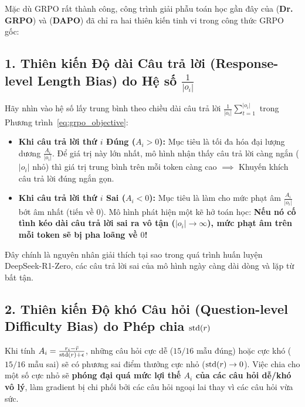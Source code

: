 Mặc dù GRPO rất thành công, công trình giải phẫu toán học gần đây của \citet{liu2025understanding} (\textbf{Dr. GRPO}) và \citet{yu2025dapo} (\textbf{DAPO}) đã chỉ ra hai thiên kiến tinh vi trong công thức GRPO gốc:

\subsection{1. Thiên kiến Độ dài Câu trả lời (Response-level Length Bias) do Hệ số $\frac{1}{|o_i|}$}
Hãy nhìn vào hệ số lấy trung bình theo chiều dài câu trả lời $\frac{1}{|o_i|} \sum_{t=1}^{|o_i|}$ trong Phương trình~\eqref{eq:grpo_objective}:
\begin{itemize}[leftmargin=1.2cm]
    \item \textbf{Khi câu trả lời thứ $i$ Đúng ($A_i > 0$):} Mục tiêu là tối đa hóa đại lượng dương $\frac{A_i}{|o_i|}$. Để giá trị này lớn nhất, mô hình nhận thấy câu trả lời càng ngắn ($|o_i|$ nhỏ) thì giá trị trung bình trên mỗi token càng cao $\implies$ Khuyến khích câu trả lời đúng ngắn gọn.
    \item \textbf{Khi câu trả lời thứ $i$ Sai ($A_i < 0$):} Mục tiêu là làm cho mức phạt âm $\frac{A_i}{|o_i|}$ bớt âm nhất (tiến về $0$). Mô hình phát hiện một kẽ hở toán học: \textbf{Nếu nó cố tình kéo dài câu trả lời sai ra vô tận ($|o_i| \to \infty$), mức phạt âm trên mỗi token sẽ bị pha loãng về $0$!}
\end{itemize}
Đây chính là nguyên nhân giải thích tại sao trong quá trình huấn luyện DeepSeek-R1-Zero, các câu trả lời sai của mô hình ngày càng dài dòng và lặp từ bất tận.

\subsection{2. Thiên kiến Độ khó Câu hỏi (Question-level Difficulty Bias) do Phép chia $\operatorname{\mathrm{std}}(r)$}
Khi tính $A_i = \frac{r_i - \bar{r}}{\operatorname{\mathrm{std}}(r) + \epsilon}$, những câu hỏi cực dễ ($15/16$ mẫu đúng) hoặc cực khó ($15/16$ mẫu sai) sẽ có phương sai điểm thưởng cực nhỏ ($\operatorname{\mathrm{std}}(r) \to 0$). Việc chia cho một số cực nhỏ sẽ \textbf{phóng đại quá mức lợi thế $A_i$ của các câu hỏi dễ/khó vô lý}, làm gradient bị chi phối bởi các câu hỏi ngoại lai thay vì các câu hỏi vừa sức.

